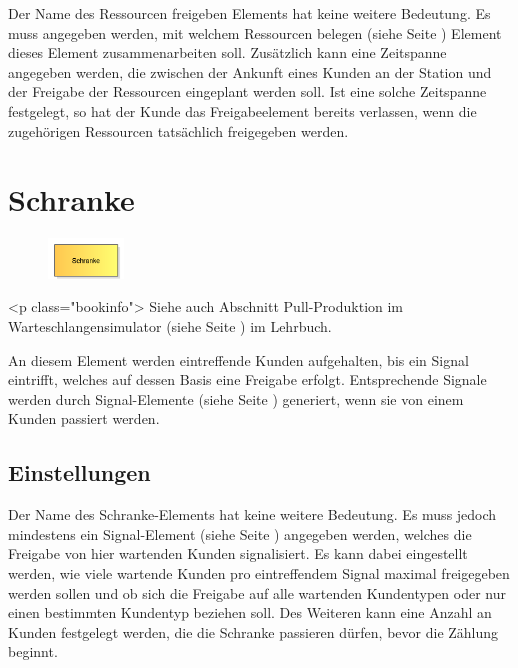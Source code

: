 Der Name des Ressourcen freigeben Elements hat keine weitere Bedeutung. Es muss angegeben werden, mit welchem
Ressourcen belegen (siehe Seite \pageref{ref:ModelElementSeize}) Element dieses Element zusammenarbeiten soll.
Zusätzlich kann eine Zeitspanne angegeben werden, die zwischen der Ankunft eines Kunden an der Station und
der Freigabe der Ressourcen eingeplant werden soll. Ist eine solche Zeitspanne festgelegt, so hat der Kunde
das Freigabeelement bereits verlassen, wenn die zugehörigen Ressourcen tatsächlich freigegeben werden.  


\section{Schranke}
\label{ref:ModelElementBarrier}

\begin{figure}
\vspace{-22pt}
\includegraphics[width=2cm]{imageModelElementBarrier.png}
\vspace{-22pt}
\end{figure}

<p class="bookinfo">
Siehe auch Abschnitt Pull-Produktion im Warteschlangensimulator (siehe Seite \pageref{ref:book:7.6.3}) im Lehrbuch.

An diesem Element werden eintreffende Kunden aufgehalten, bis ein Signal eintrifft, welches auf dessen Basis
eine Freigabe erfolgt. Entsprechende Signale werden durch Signal-Elemente (siehe Seite \pageref{ref:ModelElementSignal}) 
generiert, wenn sie von einem Kunden passiert werden.

\subsection*{Einstellungen}

Der Name des Schranke-Elements hat keine weitere Bedeutung. Es muss jedoch mindestens ein
Signal-Element (siehe Seite \pageref{ref:ModelElementSignal}) angegeben werden, welches die Freigabe
von hier wartenden Kunden signalisiert. Es kann dabei eingestellt werden,
wie viele wartende Kunden pro eintreffendem Signal maximal freigegeben werden sollen und ob sich
die Freigabe auf alle wartenden Kundentypen oder nur einen bestimmten Kundentyp beziehen soll.
Des Weiteren kann eine Anzahl an Kunden festgelegt werden, die die Schranke passieren dürfen,
bevor die Zählung beginnt.


